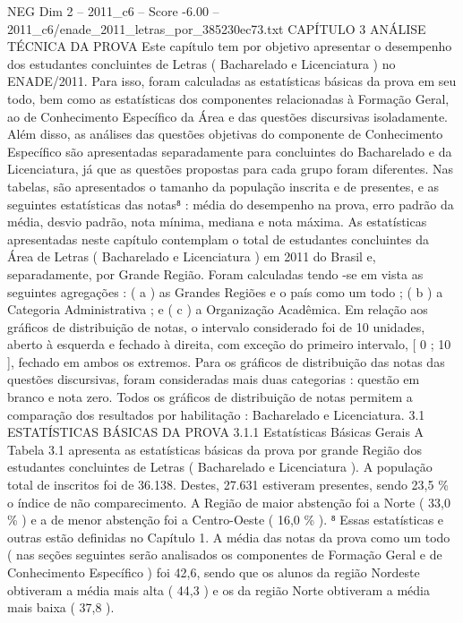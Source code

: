 \begin{textsample}{NEG Dim 2 – 2011\_c6 – Score -6.00 – 2011\_c6/enade\_2011\_letras\_por\_385230ec73.txt}  \label{ex:f2_neg_022}
CAPÍTULO 3 ANÁLISE TÉCNICA DA PROVA Este capítulo tem por objetivo apresentar o desempenho dos estudantes concluintes de Letras ( Bacharelado e Licenciatura ) no ENADE/2011.
Para isso, foram calculadas as estatísticas básicas da prova em seu todo, bem como as estatísticas dos componentes relacionadas à Formação Geral, ao de Conhecimento Específico da Área e das questões discursivas isoladamente.
Além disso, as análises das questões objetivas do componente de Conhecimento Específico são apresentadas separadamente para concluintes do Bacharelado e da Licenciatura, já que as questões propostas para cada grupo foram diferentes.
Nas tabelas, são apresentados o tamanho da população inscrita e de presentes, e as seguintes estatísticas das notas⁸ : média do desempenho na prova, erro padrão da média, desvio padrão, nota mínima, mediana e nota máxima.
As estatísticas apresentadas neste capítulo contemplam o total de estudantes concluintes da Área de Letras ( Bacharelado e Licenciatura ) em 2011 do Brasil e, separadamente, por Grande Região.
Foram calculadas tendo -se em vista as seguintes agregações : ( a ) as Grandes Regiões e o país como um todo ; ( b ) a Categoria Administrativa ; e ( c ) a Organização Acadêmica.
Em relação aos gráficos de distribuição de notas, o intervalo considerado foi de 10 unidades, aberto à esquerda e fechado à direita, com exceção do primeiro intervalo, [ 0 ; 10 ], fechado em ambos os extremos.
Para os gráficos de distribuição das notas das questões discursivas, foram consideradas mais duas categorias : questão em branco e nota zero.
Todos os gráficos de distribuição de notas permitem a comparação dos resultados por habilitação : Bacharelado e Licenciatura. 3.1 ESTATÍSTICAS BÁSICAS DA PROVA 3.1.1 Estatísticas Básicas Gerais A Tabela 3.1 apresenta as estatísticas básicas da prova por grande Região dos estudantes concluintes de Letras ( Bacharelado e Licenciatura ).
A população total de inscritos foi de 36.138.
Destes, 27.631 estiveram presentes, sendo 23,5 \% o índice de não comparecimento.
A Região de maior abstenção foi a Norte ( 33,0 \% ) e a de menor abstenção foi a Centro-Oeste ( 16,0 \% ). ⁸ Essas estatísticas e outras estão definidas no Capítulo 1.
A média das notas da prova como um todo ( nas seções seguintes serão analisados os componentes de Formação Geral e de Conhecimento Específico ) foi 42,6, sendo que os alunos da região Nordeste obtiveram a média mais alta ( 44,3 ) e os da região Norte obtiveram a média mais baixa ( 37,8 ).

\end{textsample}
